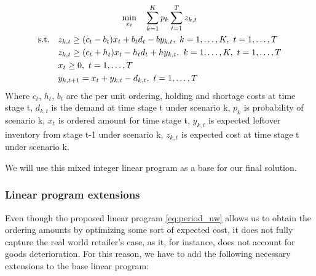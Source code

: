 \documentclass[11pt,a4paper]{article}
\begin{document}
\begin{equation}
\label{eq:period_nw}
\begin{gathered}
\min_{x_{t}} \quad 
\sum\limits_{k=1}^{K}{ p_k \sum\limits_{t=1}^{T}{ z_{k,t} }} \\
\begin{aligned}
\textup{s.t.}\quad  & z_{k,t}  \geq (c_t-b_t)x_{t} + b_t d_{t} - b y_{k,t} ,\ k = 1,\dots,K,\  t = 1,\dots,T\\
                  & z_{k,t}  \geq (c_t+h_t)x_{t} - h_t d_{t} + h y_{k,t} ,\ k = 1,\dots,K,\  t = 1,\dots,T  \\
        & x_{t} \geq 0,\  t = 1,\dots,T\\ 
        &  y_{k,t+1} = x_{t} + y_{k,t} - d_{k,t},\  t = 1,\dots,T\\
\end{aligned}
\end{gathered}
\end{equation}
Where $c_t$, $h_t$, $b_t$ are the per unit ordering, holding and shortage costs at time stage t, $d_{k,t}$ is the demand at time stage t under scenario k, $p_k$ is probability of scenario k, $x_{t}$ is ordered amount for time stage t, $y_{k,t}$ is expected leftover inventory from stage t-1 under scenario k, $z_{k,t}$ is expected cost at time stage t under scenario k.

We will use this mixed integer linear program as a base for our final solution.

\subsubsection{Linear program extensions}
Even though the proposed linear program \ref{eq:period_nw} allows us to obtain the ordering amounts by optimizing some sort of expected cost, it does not fully capture the real world retailer's case, as it, for instance, does not account for goods deterioration. For this reason, we have to add the following necessary extensions to the base linear program:
\end{document}
